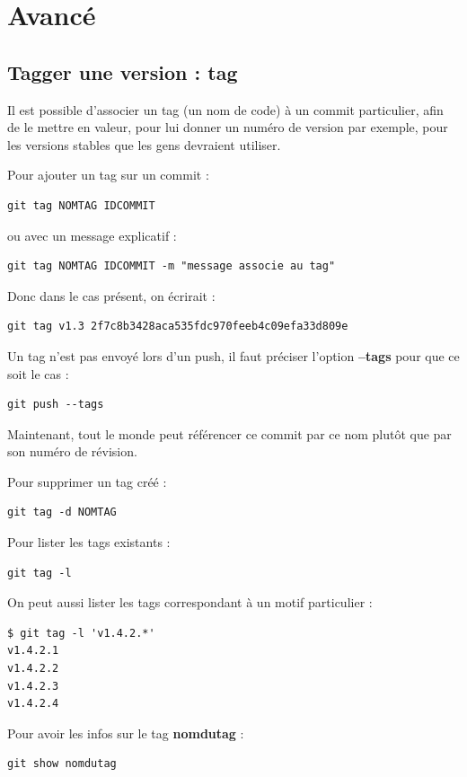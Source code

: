 \documentclass[a4paper,twoside]{article}
\begin{document}
\section{Avancé}
\subsection{Tagger une version : tag}
Il est possible d'associer un tag (un nom de code) à un commit particulier, afin de le mettre en valeur, pour lui donner un numéro de version par exemple, pour les versions stables que les gens devraient utiliser.

Pour ajouter un tag sur un commit :
\begin{verbatim}
git tag NOMTAG IDCOMMIT
\end{verbatim}
ou avec un message explicatif :
\begin{verbatim}
git tag NOMTAG IDCOMMIT -m "message associe au tag"
\end{verbatim}


Donc dans le cas présent, on écrirait :
\begin{verbatim}
git tag v1.3 2f7c8b3428aca535fdc970feeb4c09efa33d809e
\end{verbatim}

Un tag n'est pas envoyé lors d'un push, il faut préciser l'option \textbf{--tags} pour que ce soit le cas :
\begin{verbatim}
git push --tags
\end{verbatim}

Maintenant, tout le monde peut référencer ce commit par ce nom plutôt que par son numéro de révision.

\bigskip

Pour supprimer un tag créé :
\begin{verbatim}
git tag -d NOMTAG
\end{verbatim}

\bigskip

Pour lister les tags existants :
\begin{verbatim}
git tag -l
\end{verbatim}

On peut aussi lister les tags correspondant à un motif particulier : 
\begin{verbatim}
$ git tag -l 'v1.4.2.*'
v1.4.2.1
v1.4.2.2
v1.4.2.3
v1.4.2.4
\end{verbatim}

\bigskip

Pour avoir les infos sur le tag \textbf{nomdutag} : 
\begin{verbatim}
git show nomdutag
\end{verbatim}
\end{document}
